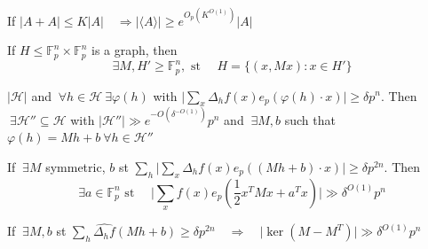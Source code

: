 \begin{theorem} If $\lvert A + A \rvert \leq K \lvert A \rvert \quad  \Rightarrow \lvert \langle A \rangle \rvert \geq e^{O_p(K^{O(1)})} \lvert A \rvert $
\end{theorem}

\begin{proposition} If $H \leq \mathbb{F}_p^n \times \mathbb{F}_p^n$ is a graph, then
\[
\ \exists M, H' \geq \mathbb{F}_p^n, \text{ st } \quad H = \{(x, Mx) : x \in H'\}
\]
\end{proposition}

\begin{proposition} $\lvert \mathcal{H}  \rvert $ and $\ \forall  h \in \mathcal{H} \ \exists \varphi (h)$ with $\lvert \sum_{x} \Delta _h f(x) e_p (\varphi (h) \cdot x) \rvert \geq \delta p^n$. Then $\ \exists \mathcal{H}'' \subseteq \mathcal{H} $ with 
$ \lvert \mathcal{H}''  \rvert \gg e ^{-O(\delta ^{-O(1)})}p^{n} $ and $\ \exists M, b$ such that $\varphi (h) = Mh + b \ \forall  h \in \mathcal{H}'' $ 
\end{proposition}

\begin{proposition} If $\ \exists M$ symmetric, $b$ st $ \sum_h \lvert \sum_x \Delta _h f(x)e_p ((Mh+b)\cdot x) \rvert \geq \delta p^{2n}$. Then
\[
\ \exists a \in \mathbb{F}_p ^{n} \text{ st } \quad  \lvert \sum_x f(x)e_p(\frac{1}{2}x^TMx + a^Tx) \rvert \gg \delta ^{O(1)}p^n
\]
\end{proposition}

\begin{proposition} If $\ \exists M, b$ st $ \sum_h \hat{\Delta _hf}(Mh+b) \geq \delta p^{2n} \quad \Rightarrow \quad  \lvert \ker (M-M^T) \rvert \gg \delta ^{O(1)}p^n$
\end{proposition}
